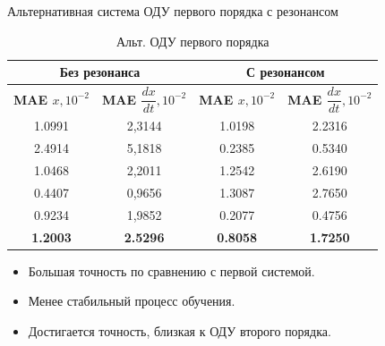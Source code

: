 \documentclass{beamer}
\begin{document}
\begin{frame}{Альтернативная система ОДУ первого порядка с резонансом}
    \begin{table}[h!]
        \centering
        \begin{tabular}{|c|c|c|c|}
        \hline
        \multicolumn{2}{|c|}{\textbf{Без резонанса}} & \multicolumn{2}{|c|}{\textbf{С резонансом}} \\
        \hline
        \textbf{MAE $x, 10^{-2}$} & \textbf{MAE $\dfrac{dx}{dt}, 10^{-2}$} & \textbf{MAE $x, 10^{-2}$} & \textbf{MAE $\dfrac{dx}{dt}, 10^{-2}$} \\
        \hline
        1.0991 & 2,3144 & 1.0198 & 2.2316 \\
        2.4914 & 5,1818 & 0.2385 & 0.5340 \\
        1.0468 & 2,2011 & 1.2542 & 2.6190 \\
        0.4407 & 0,9656 & 1.3087 & 2.7650 \\
        0.9234 & 1,9852 & 0.2077 & 0.4756 \\
        \hline
        \textbf{1.2003} & \textbf{2.5296} & \textbf{0.8058} & \textbf{1.7250} \\
        \hline
        \end{tabular}
        \caption{Альт. ОДУ первого порядка}
    \end{table}

    \begin{itemize}
        \item Большая точность по сравнению с первой системой.
        \item Менее стабильный процесс обучения.
        \item Достигается точность, близкая к ОДУ второго порядка.
    \end{itemize}
\end{frame}
\end{document}
